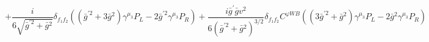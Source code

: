 %
\begin{dmath*}
%
  +  \frac{i}{6 \sqrt{{\bar g}^{\prime 2} + {\bar g}{}^2}}\delta_{f_1 f_2}  \left(\left({\bar g}^{\prime 2} + 3 {\bar g}{}^2\right) \gamma^{\mu_3} P_L - 2 {\bar g}^{\prime 2} \gamma^{\mu_3} P_R\right)  +  \frac{i {\bar g}^\prime {\bar g}{} v^2}{6 \left({\bar g}^{\prime 2} + {\bar g}{}^2\right)^{3/2}}\delta_{f_1 f_2}  C^{ \varphi  WB} \left(\left(3 {\bar g}^{\prime 2} + {\bar g}{}^2\right) \gamma^{\mu_3} P_L - 2 {\bar g}{}^2 \gamma^{\mu_3} P_R\right)
%
\end{dmath*}
%
